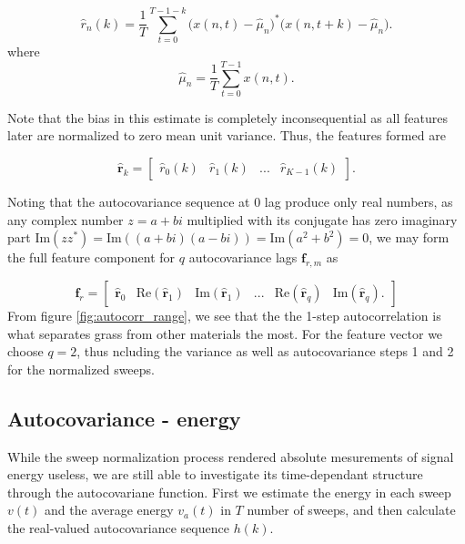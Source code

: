 \begin{equation}
	\hat{r}_n(k) = \frac{1}{T}\sum_{t=0}^{T-1-k}\big(x(n,t) - \hat{\mu}_n\big)^*\big(x(n,t+k) - \hat{\mu}_n\big).
\end{equation}
where 
\begin{equation}
	\hat{\mu}_n = \frac1T \sum_{t=0}^{T-1}x(n,t).
\end{equation}

Note that the bias in this estimate is completely inconsequential as all features later are normalized to zero mean unit variance.  Thus, the features formed are

\begin{equation}
	\hat{\mathbf{r}}_{k} = 
	\begin{bmatrix}
		\hat{r}_0(k) & \hat{r}_1(k) & ... & \hat{r}_{K-1}(k)
	\end{bmatrix}.
\end{equation}

Noting that the autocovariance sequence at 0 lag produce only real numbers, as any complex number $z = a + bi$ multiplied with its conjugate has zero imaginary part $\text{Im}(zz^*) = \text{Im}((a + bi)(a - bi)) = \text{Im}(a^2 + b^2) = 0$, we may form the full feature component for $q$ autocovariance lags $\mathbf{f}_{r,m}$ as

\begin{equation}
	\mathbf{f}_{r} = 
	\begin{bmatrix}
		\hat{\mathbf{r}}_{0}  & \text{Re}(\hat{\mathbf{r}}_{1} ) & \text{Im}(\hat{\mathbf{r}}_{1} ) & ... & \text{Re}(\hat{\mathbf{r}}_{q} ) & \text{Im}(\hat{\mathbf{r}}_{q} ).
	\end{bmatrix}
\end{equation}
From figure \ref{fig:autocorr_range}, we see that the the 1-step autocorrelation is what separates grass from other materials the most. For the feature vector we choose $q=2$, thus ncluding the variance as well as autocovariance steps 1 and 2 for the normalized sweeps.


\subsection{Autocovariance - energy}

While the sweep normalization process rendered absolute mesurements of signal energy useless, we are still able to investigate its time-dependant structure through the autocovariane function. First we estimate the energy in each sweep $v(t)$ and the average energy $v_a(t)$ in $T$ number of sweeps, and then calculate the real-valued autocovariance sequence $h(k)$. 


